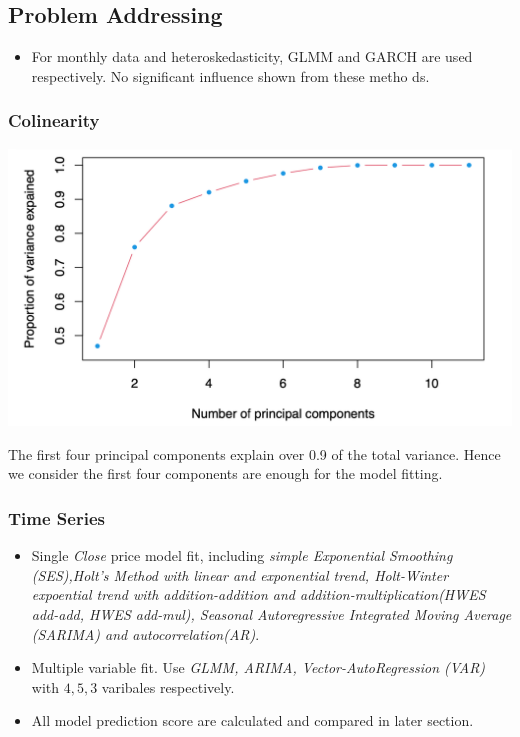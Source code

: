 \documentclass[a0,portrait]{a0poster}
\begin{document}
\begin{multicols}{3}
\subsection*{Problem Addressing}
\begin{itemize}
    \item 
For monthly data and heteroskedasticity, GLMM and GARCH are used respectively. No significant influence shown from these metho ds.
\end{itemize}
\subsubsection*{Colinearity}
\begin{center}
\includegraphics[width=1.0\linewidth]{colli.png}
\end{center}
The first four principal components explain over 0.9 of the total variance. Hence we consider the first four components are enough for the model fitting.
\subsubsection*{Time Series}
\begin{itemize}
    \item Single \textit{Close} price model fit, including \textit{simple Exponential Smoothing (SES),Holt’s Method with linear and exponential trend, Holt-Winter expoential trend with addition-addition and addition-multiplication(HWES add-add, HWES add-mul), Seasonal Autoregressive Integrated Moving Average (SARIMA) and autocorrelation(AR)}.
    \item Multiple variable fit. Use \textit{GLMM, ARIMA, Vector-AutoRegression (VAR)} with $4,5,3$ varibales respectively.
    \item All model prediction score are calculated and compared in later section. 
\end{itemize}


\end{multicols}
\end{document}
